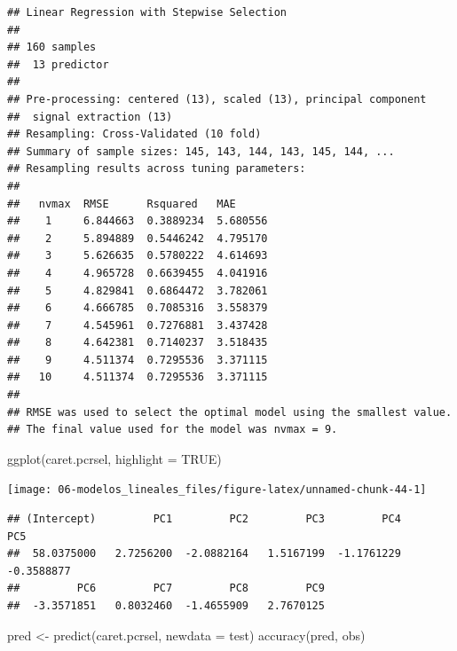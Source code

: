 \documentclass[
  spanish,
]{book}
\newenvironment{Shaded}{\begin{snugshade}}{\end{snugshade}}
\newcommand{\AttributeTok}[1]{\textcolor[rgb]{0.77,0.63,0.00}{#1}}
\newcommand{\ConstantTok}[1]{\textcolor[rgb]{0.00,0.00,0.00}{#1}}
\newcommand{\FunctionTok}[1]{\textcolor[rgb]{0.00,0.00,0.00}{#1}}
\newcommand{\NormalTok}[1]{#1}
\newcommand{\OtherTok}[1]{\textcolor[rgb]{0.56,0.35,0.01}{#1}}
\newcommand{\SpecialCharTok}[1]{\textcolor[rgb]{0.00,0.00,0.00}{#1}}
\theoremstyle{break}
\theoremstyle{definition}
\theoremstyle{definition}
\theoremstyle{definition}
\theoremstyle{definition}
\theoremstyle{remark}
\begin{document}
\begin{verbatim}
## Linear Regression with Stepwise Selection 
## 
## 160 samples
##  13 predictor
## 
## Pre-processing: centered (13), scaled (13), principal component
##  signal extraction (13) 
## Resampling: Cross-Validated (10 fold) 
## Summary of sample sizes: 145, 143, 144, 143, 145, 144, ... 
## Resampling results across tuning parameters:
## 
##   nvmax  RMSE      Rsquared   MAE     
##    1     6.844663  0.3889234  5.680556
##    2     5.894889  0.5446242  4.795170
##    3     5.626635  0.5780222  4.614693
##    4     4.965728  0.6639455  4.041916
##    5     4.829841  0.6864472  3.782061
##    6     4.666785  0.7085316  3.558379
##    7     4.545961  0.7276881  3.437428
##    8     4.642381  0.7140237  3.518435
##    9     4.511374  0.7295536  3.371115
##   10     4.511374  0.7295536  3.371115
## 
## RMSE was used to select the optimal model using the smallest value.
## The final value used for the model was nvmax = 9.
\end{verbatim}

\begin{Shaded}
\begin{Highlighting}[]
\FunctionTok{ggplot}\NormalTok{(caret.pcrsel, }\AttributeTok{highlight =} \ConstantTok{TRUE}\NormalTok{)}
\end{Highlighting}
\end{Shaded}

\begin{center}\texttt{[image: 06-modelos\_lineales\_files/figure-latex/unnamed-chunk-44-1]} \end{center}

\begin{Shaded}
\end{Shaded}

\begin{verbatim}
## (Intercept)         PC1         PC2         PC3         PC4         PC5 
##  58.0375000   2.7256200  -2.0882164   1.5167199  -1.1761229  -0.3588877 
##         PC6         PC7         PC8         PC9 
##  -3.3571851   0.8032460  -1.4655909   2.7670125
\end{verbatim}

\begin{Shaded}
\begin{Highlighting}[]
\NormalTok{pred }\OtherTok{\textless{}{-}} \FunctionTok{predict}\NormalTok{(caret.pcrsel, }\AttributeTok{newdata =}\NormalTok{ test)}
\FunctionTok{accuracy}\NormalTok{(pred, obs)}
\end{Highlighting}
\end{Shaded}
\end{document}
